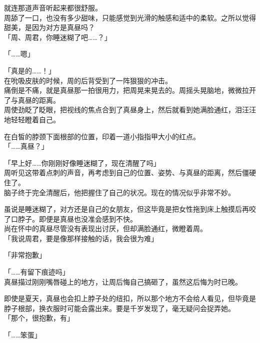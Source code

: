 就连那道声音听起来都很舒服。\\

周舔了一口，也没有多少甜味，只能感觉到光滑的触感和适中的柔软。之所以觉得甜美，是因为对方是真昼吗？\\

「周、周君，你睡迷糊了吧……？」

「……嗯」

「真是的……！」\\

在吮吸皮肤的时候，周的后背受到了一阵狠狠的冲击。\\

痛倒是不痛，就是真昼那一拍很用力，把周晃来晃去的。周摇头晃脑地，微微拉开了与真昼的距离。\\

周使劲眨了眨眼，把视线的焦点合到了真昼身上，然后就看到她满脸通红，泪汪汪地轻轻瞪着自己。

在白皙的脖颈下面根部的位置，印着一道小指指甲大小的红点。\\

「……真昼？」

「早上好……你刚刚好像睡迷糊了，现在清醒了吗」\\

周听见这带着点刺的声音，再考虑到自己的位置、姿势、与真昼的距离，然后僵硬住了。\\

脑子终于完全清醒后，他把握住了自己的状况。现在的情况似乎非常不妙。

虽说是睡迷糊了，对方还是自己的女朋友，但这毕竟是把女性拖到床上触摸后再咬了口脖子。即便是真昼也没准会感到不快。\\

尚在怀中的真昼尽管没有表现出讨厌，但却满脸通红，微瞪着周。\\

「我说周君，要是像那样接触的话，我会很为难」

「非常抱歉」

「……有留下痕迹吗」\\

真昼描过刚刚嘴唇碰上的地方，让周后悔自己搞砸了，虽然这后悔为时已晚。

即使是夏天，真昼也会扣上脖子处的纽扣，所以那个地方不会给人看见，但毕竟是脖子根部，换衣服时可能会露出来。要是千岁发现了，毫无疑问会捉弄她。\\

「那个，很抱歉，有」

「……笨蛋」\\


